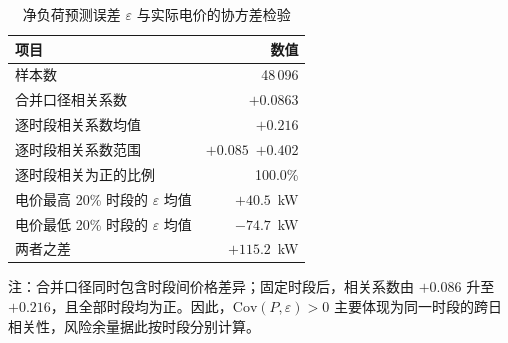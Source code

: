 \begin{table}[htbp]
  \centering
  \caption{净负荷预测误差 $\varepsilon$ 与实际电价的协方差检验}
  \label{tab:p4-cov}
  \small
  \begin{tabular}{lr}
    \toprule
    项目 & 数值 \\
    \midrule
    样本数 & 48\,096 \\
    合并口径相关系数 & $+0.0863$ \\
    逐时段相关系数均值 & $+0.216$ \\
    逐时段相关系数范围 & $+0.085$~$+0.402$ \\
    逐时段相关为正的比例 & 100.0\% \\
    \midrule
    电价最高 20\% 时段的 $\varepsilon$ 均值 & $+40.5$~kW \\
    电价最低 20\% 时段的 $\varepsilon$ 均值 & $-74.7$~kW \\
    两者之差 & $+115.2$~kW \\
    \bottomrule
  \end{tabular}
  \par\vspace{2pt}
  \begin{minipage}{\textwidth}\footnotesize
    注：合并口径同时包含时段间价格差异；固定时段后，相关系数由 $+0.086$ 升至 $+0.216$，且全部时段均为正。因此，$\mathrm{Cov}(P,\varepsilon)>0$ 主要体现为同一时段的跨日相关性，风险余量据此按时段分别计算。
  \end{minipage}
\end{table}

